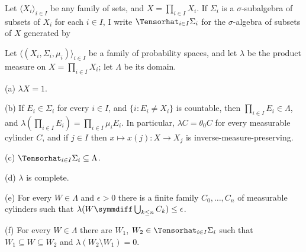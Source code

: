  Let $\langle X_i\rangle_{i\in I}$ be any
family of sets, and $X=\prod_{i\in I}X_i$.   If $\Sigma_i$ is a
$\sigma$-subalgebra of subsets of $X_i$ for each $i\in I$, I write
$\Tensorhat_{i\in I}\Sigma_i$ for the $\sigma$-algebra of subsets of $X$
generated by



 Let $\langle(X_i,\Sigma_i,\mu_i)\rangle_{i\in I}$
be a family of probability spaces, and let $\lambda$ be the product
measure on $X=\prod_{i\in I}X_i$;  let
$\Lambda$ be its domain.

(a) $\lambda X=1$.

(b) If $E_i\in\Sigma_i$ for every $i\in I$, and $\{i:E_i\ne X_i\}$ is
countable, then $\prod_{i\in I}E_i\in\Lambda$, and
$\lambda(\prod_{i\in I}E_i)=\prod_{i\in I}\mu_iE_i$.   In particular,
$\lambda C=\theta_0C$
for every measurable cylinder $C$, and if
$j\in I$ then $x\mapsto x(j):X\to X_j$ is inverse-measure-preserving.

(c) $\Tensorhat_{i\in I}\Sigma_i\subseteq\Lambda$.

(d) $\lambda$ is complete.

(e) For every $W\in\Lambda$ and $\epsilon>0$ there is a finite family
$C_0,\ldots,C_n$ of measurable cylinders such that
$\lambda(W\symmdiff\bigcup_{k\le n}C_k)\penalty-100\le\epsilon$.

(f) For every $W\in\Lambda$ there are $W_1$,
$W_2\in\Tensorhat_{i\in I}\Sigma_i$ such that
$W_1\subseteq W\subseteq W_2$ and $\lambda(W_2\setminus W_1)=0$.


